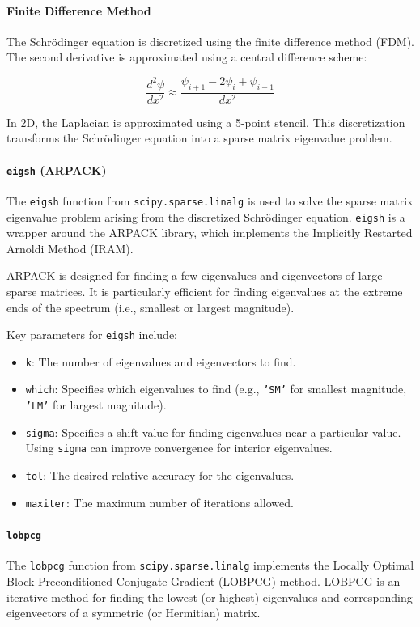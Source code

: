\documentclass{article}
\begin{document}
\paragraph{Finite Difference Method}
The Schrödinger equation is discretized using the finite difference method (FDM). The second derivative is approximated using a central difference scheme:

\[
	\frac{d^2\psi}{dx^2} \approx \frac{\psi_{i+1} - 2\psi_i + \psi_{i-1}}{dx^2}
\]

In 2D, the Laplacian is approximated using a 5-point stencil. This discretization transforms the Schrödinger equation into a sparse matrix eigenvalue problem.

\paragraph{\texttt{eigsh} (ARPACK)}
The \texttt{eigsh} function from \texttt{scipy.sparse.linalg} is used to solve the sparse matrix eigenvalue problem arising from the discretized Schrödinger equation. \texttt{eigsh} is a wrapper around the ARPACK library, which implements the Implicitly Restarted Arnoldi Method (IRAM).

ARPACK is designed for finding a few eigenvalues and eigenvectors of large sparse matrices. It is particularly efficient for finding eigenvalues at the extreme ends of the spectrum (i.e., smallest or largest magnitude).

Key parameters for \texttt{eigsh} include:
\begin{itemize}
	\item \texttt{k}: The number of eigenvalues and eigenvectors to find.
	\item \texttt{which}: Specifies which eigenvalues to find (e.g., \texttt{'SM'} for smallest magnitude, \texttt{'LM'} for largest magnitude).
	\item \texttt{sigma}: Specifies a shift value for finding eigenvalues near a particular value. Using \texttt{sigma} can improve convergence for interior eigenvalues.
	\item \texttt{tol}: The desired relative accuracy for the eigenvalues.
	\item \texttt{maxiter}: The maximum number of iterations allowed.
\end{itemize}

\paragraph{\texttt{lobpcg}}
The \texttt{lobpcg} function from \texttt{scipy.sparse.linalg} implements the Locally Optimal Block Preconditioned Conjugate Gradient (LOBPCG) method. LOBPCG is an iterative method for finding the lowest (or highest) eigenvalues and corresponding eigenvectors of a symmetric (or Hermitian) matrix.
\end{document}
